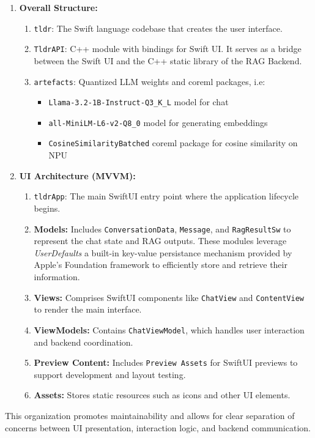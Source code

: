 \begin{enumerate}[label=\Alph*.]
    \item \textbf{Overall Structure:}
    \begin{enumerate}[label=\alph*.]
        \item \texttt{tldr}: The Swift language codebase that creates the user interface.
        \item \texttt{TldrAPI}: C++ module with bindings for Swift UI. It serves as a bridge between the Swift UI and the C++ static library of the RAG Backend.
    \item \texttt{artefacts}: Quantized LLM weights and coreml packages, i.e:
    \begin{itemize}
        \item \texttt{Llama-3.2-1B-Instruct-Q3\_K\_L} model for chat
        \item \texttt{all-MiniLM-L6-v2-Q8\_0} model for generating embeddings
        \item \texttt{CosineSimilarityBatched} coreml package for cosine similarity on NPU
    \end{itemize}
    \end{enumerate}

    \item \textbf{UI Architecture (MVVM):}
    \begin{enumerate}[label=\alph*.]
        \item \texttt{tldrApp}: The main SwiftUI entry point where the application lifecycle begins.
        \item \textbf{Models:} Includes \texttt{ConversationData}, \texttt{Message}, and \texttt{RagResultSw} to represent the chat state and RAG outputs. These modules leverage \textit{UserDefaults} a built-in key-value persistance mechanism provided by Apple's Foundation framework to efficiently store and retrieve their information.
        \item \textbf{Views:} Comprises SwiftUI components like \texttt{ChatView} and \texttt{ContentView} to render the main interface.
        \item \textbf{ViewModels:} Contains \texttt{ChatViewModel}, which handles user interaction and backend coordination.
        \item \textbf{Preview Content:} Includes \texttt{Preview Assets} for SwiftUI previews to support development and layout testing.
        \item \textbf{Assets:} Stores static resources such as icons and other UI elements.
    \end{enumerate}
\end{enumerate}
This organization promotes maintainability and allows for clear separation of concerns between UI presentation, interaction logic, and backend communication.

